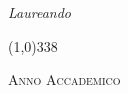 \begin{titlepage}
\begin{center}
\begin{large}
			\vspace{0pt}
		
			\begin{flushright}
				\textit{Laureando}\\
				\vspace{5pt}
				\autore
			\end{flushright}
		
		\end{large}
	
		\vspace{40pt}
		\line(1,0){338} \\
		
		\begin{normalsize}
			\textsc{Anno Accademico \myAA}
		\end{normalsize}

	\end{center}

\end{titlepage}